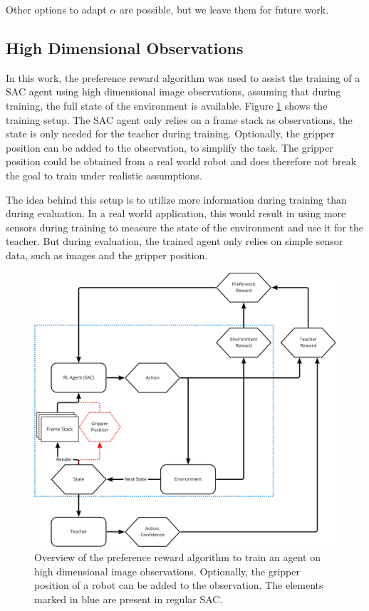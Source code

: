 Other options to adapt $\alpha$ are possible, but we leave them for future work.

\subsection{High Dimensional Observations}
\label{sec:algo-high-dim-observations}

In this work, the preference reward algorithm was used to assist the training of a SAC agent using high dimensional image observations, assuming that during training, the full state of the environment is available. Figure \ref{fig:algorithm} shows the training setup. The SAC agent only relies on a frame stack as observations, the state is only needed for the teacher during training. Optionally, the gripper position can be added to the observation, to simplify the task. The gripper position could be obtained from a real world robot and does therefore not break the goal to train under realistic assumptions.

The idea behind this setup is to utilize more information during training than during evaluation. In a real world application, this would result in using more sensors during training to measure the state of the environment and use it for the teacher. But during evaluation, the trained agent only relies on simple sensor data, such as images and the gripper position.

\begin{figure}[btp]
    \centering
    \includegraphics[width=\textwidth]{images/algorithm.jpg}
    \caption[Overview of the preference reward algorithm]{Overview of the preference reward algorithm to train an agent on high dimensional image observations. Optionally, the gripper position of a robot can be added to the observation. The elements marked in blue are present in regular SAC.}
    \label{fig:algorithm}
\end{figure}

